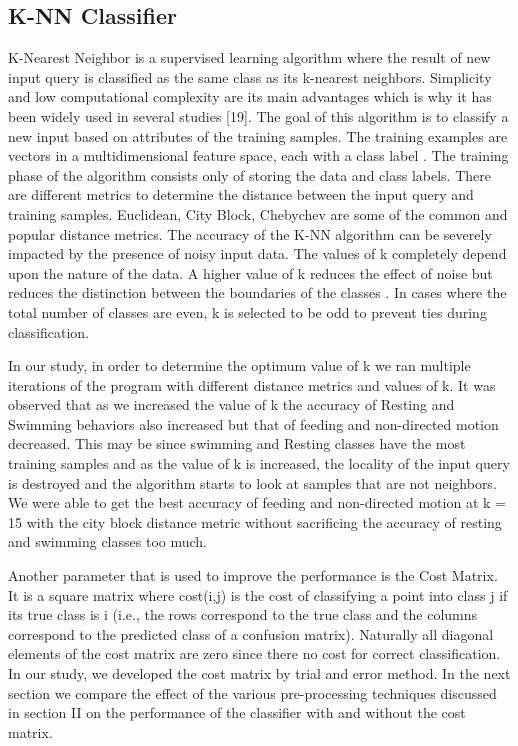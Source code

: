 \documentclass[conference]{IEEEtran}
\begin{document}
\subsection{K-NN Classifier}

K-Nearest Neighbor is a supervised learning algorithm where the result of new input query is classified as the same class as its k-nearest neighbors. Simplicity and low computational complexity are its main advantages which is why it has been widely used in several studies \cite{17}\cite{18}[19]. The goal of this algorithm is to classify a new input based on attributes of the training samples. The training examples are vectors in a multidimensional feature space, each with a class label \cite{18}. The training phase of the algorithm consists only of storing the data and class labels. There are different metrics to determine the distance between the input query and training samples. Euclidean, City Block, Chebychev are some of the common and popular distance metrics. The accuracy of the K-NN algorithm can be severely impacted by the presence of noisy input data. The values of k completely depend upon the nature of the data. A higher value of k reduces the effect of noise but reduces the distinction between the boundaries of the classes \cite{18}. In cases where the total number of classes are even, k is selected to be odd to prevent ties during classification. 

In our study, in order to determine the optimum value of k we ran multiple iterations of the program with different distance metrics and values of k. It was observed that as we increased the value of k the accuracy of Resting and Swimming behaviors also increased but that of feeding and non-directed motion decreased. This may be since swimming and Resting classes have the most training samples and as the value of k is increased, the locality of the input query is destroyed and the algorithm starts to look at samples that are not neighbors.  We were able to get the best accuracy of feeding and non-directed motion at k = 15 with the city block distance metric without sacrificing the accuracy of resting and swimming classes too much.

Another parameter that is used to improve the performance is the Cost Matrix. It is a square matrix where cost(i,j) is the cost of classifying a point into class j if its true class is i (i.e., the rows correspond to the true class and the columns correspond to the predicted class of a confusion matrix). Naturally all diagonal elements of the cost matrix are zero since there no cost for correct classification. In our study, we developed the cost matrix by trial and error method. In the next section we compare the effect of the various pre-processing techniques discussed in section II on the performance of the classifier with and without the cost matrix.
\end{document}
